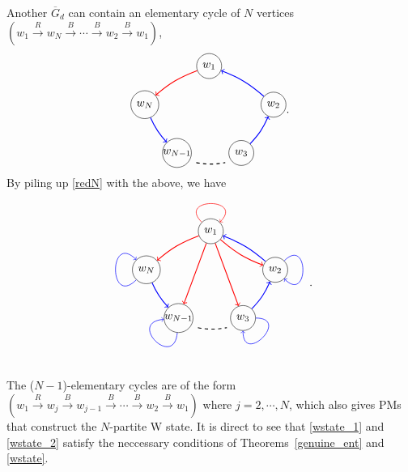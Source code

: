 \documentclass[a4paper,twocolumn,8pt,accepted=2021-12-15]{quantumarticle}
\def\dc{{\overline{G}_d }}
\begin{document}
	Another $\dc$ can contain an elementary cycle of $N$ vertices $(w_1\xrightarrow{R}w_N\xrightarrow{B}\cdots \xrightarrow{B} w_2 \xrightarrow{B} w_1)$,
	\begin{align}
		\begin{tikzpicture}[baseline={([yshift=-.5ex]current bounding box.center)}]
			\node[circle,draw] (a) at (6,2.7) {$w_1$};
			\node[circle,draw] (b) at (8,1.5) {$w_2$};		
			\node[circle,draw] (c) at (7,0) {$w_3$};
			\node[circle,minimum size =0.9cm, draw] (d) at (5,0) { };
			\node[circle,draw] (e) at (4,1.5) {$w_N$};		
			\path[line width = 0.8pt,color=red,->] (a) edge[bend right=10]  (e);
			\path[line width = 0.8pt,color=blue,->] (e) edge[bend right=10] (d);
			\path[line width = 0.8pt,color=blue,->] (c) edge[bend right=10] (b);
			\path[line width = 0.8pt,color=blue,->] (b) edge[bend right=10] (a);
			\draw[thick, dashed] (5.6,-0.3) to[bend right=10] (6.5,-.3);		
			\draw (5,0) node {$w_{N-1}$};	
		\end{tikzpicture}.
	\end{align}
	By piling up \eqref{redN} with the above, we have
	\begin{align}\label{wstate_2}
		\begin{tikzpicture}[baseline={([yshift=-.5ex]current bounding box.center)}]
			\node[circle,draw] (a) at (6,2.7) {$w_1$};
			\node[circle,draw] (b) at (8,1.5) {$w_2$};		
			\node[circle,draw] (c) at (7,0) {$w_3$};
			\node[circle,minimum size =0.9cm, draw] (d) at (5,0) { };
			\node[circle,draw] (e) at (4,1.5) {$w_N$};	
			\path[every loop/.style={min distance=10mm,in=45,out=135,looseness=5,color=red ,->},line width = 0.5pt] (a) edge [loop above]   (a);
			\path[every loop/.style={min distance=10mm,in=-45,out=45,looseness=5,color=blue},line width = 0.5pt,->] (b) edge [loop above] (b);
			\path[every loop/.style={min distance=10mm,in=270,out=0,looseness=5,color=blue ,->},line width = 0.5pt] (c) edge [loop above]  (c);
			\path[every loop/.style={min distance=10mm,in=185,out=265,looseness=5,color=blue ,->},line width = 0.5pt] (d) edge [loop above]  (d);
			\path[every loop/.style={min distance=10mm,in=135,out=-135,looseness=5,color=blue ,->},line width = 0.5pt] (e) edge [loop above]  (e);				
			\path[line width = 0.8pt,color=red,->] (a) edge[bend right=10]  (e);
			\path[line width = 0.8pt,color=blue,->] (e) edge[bend right=10] (d);
			\path[line width = 0.8pt,color=blue,->] (c) edge[bend right=10] (b);
			\path[line width = 0.8pt,color=blue,->] (b) edge[bend right=10] (a);
			\path[line width = 0.8pt,color=red,->] (a) edge  (d);
			\path[line width = 0.8pt,color=red,->] (a) edge  (c);
			\path[line width = 0.8pt,color=red,->] (a) edge[bend right=10]  (b);
			\draw[thick, dashed] (5.6,-0.3) to[bend right=10] (6.5,-.3);		
			\draw (5,0) node {$w_{N-1}$};	
		\end{tikzpicture}.
	\end{align} 
	The ($N-1$)-elementary cycles are of the form
	$(w_1\xrightarrow{R}w_j\xrightarrow{B}w_{j-1}\xrightarrow{B}\cdots \xrightarrow{B}w_2\xrightarrow{B}w_1)$ where $j=2,\cdots, N$, which also gives PMs that construct the $N$-partite W state.  It is direct to see that \eqref{wstate_1} and \eqref{wstate_2} satisfy the neccessary conditions of Theorems~\ref{genuine_ent} and \ref{wstate}. 
	
\end{document}
